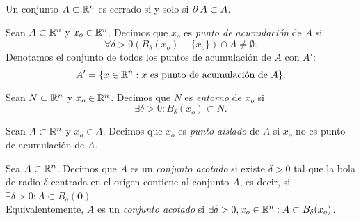    \begin{propertie} \label{prop:cerrado_front}
    Un conjunto $A \subset \mathbb{R}^n$ es cerrado si y solo si $\operatorname{\partial} A \subset A$.
   \end{propertie}
   
   \begin{definition}  \label{def:pto_acum}
    Sean $A \subset \mathbb{R}^n \text{ y } x_o \in \mathbb{R}^n$. Decimos que $x_o$ es \emph{punto de acumulaci\'on} de $A$ si
    \[
     \forall \delta > 0 \left( B_{\delta}(x_o) - \{ x_o \} \right) \cap A \ne \emptyset. 
    \]
    Denotamos el conjunto de todos los puntos de acumulaci\'on de $A$ con $A'$:
    \[
     A' = \{ x \in \mathbb{R}^n : x \text{ es punto de acumulaci\'on de } A \}.
    \]
   
   \end{definition}
   
   \begin{definition}  \label{def:entorno}
    Sean $N \subset  \mathbb{R}^n$ y $x_o \in \mathbb{R}^n$. Decimos que $N$ es \emph{entorno} de $x_o$ si
    \[
     \exists \delta > 0 : B_{\delta}(x_o) \subset N.
    \]
   \end{definition}
   
   \begin{definition}  \label{def:pto_ais}
    Sean $A \subset  \mathbb{R}^n$ y $x_o \in A$. Decimos que $x_o$ es \emph{punto aislado} de $A$ si $x_o$ no es punto de acumulaci\'on de $A$.
   \end{definition}
   
   \begin{definition}  \label{def:conj_acotado}
    Sea $A \subset \mathbb{R}^n$. Decimos que $A$ es un \emph{conjunto acotado} si existe $\delta > 0$ tal que la bola de radio $\delta$  centrada en el origen contiene al conjunto $A$, es decir, si $\exists \delta > 0 : A \subset B_{\delta}(\mathbf{0})$.\\
    Equivalentemente, $A$ es un \emph{conjunto acotado} si $\exists \delta > 0, x_o \in \mathbb{R}^n : A \subset B_{\delta}(x_o)$.
   \end{definition}
   